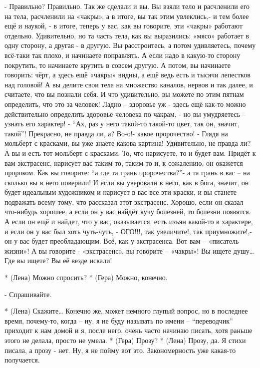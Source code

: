 - Правильно? Правильно. Так же сделали и вы. Вы взяли тело и расчленили его на тела, расчленили на «чакры», а в итоге, вы так этим увлеклись,- и тем более ещё и наукой, - в итоге, теперь у вас, как вы говорите, эти «чакры» работают отдельно. Удивительно, но та часть тела, как вы выразились: «мясо» работает в одну сторону, а другая - в другую. Вы расстроитесь, а потом удивляетесь, почему всё-таки так плохо, и начинаете поправлять. А если надо в какую-то сторону покрутить, то начинаете крутить в совсем другую. А потом, вы начинаете говорить: чёрт, а здесь ещё «чакры» видны, а ещё ведь есть и тысячи лепестков над головой! А вы  делите свои тела на множество каналов, нервов и так далее, и считаете, что вы познали себя. И что удивительно, вы можете по этим пятнам определить, что это за человек! Ладно – здоровье  уж - здесь ещё как-то можно действительно определить здоровье  человека по чакрам, - но вы умудряетесь – узнать его характер! - “Ах, раз у него такой-то такой-то цвет, так он, значит, такой”! Прекрасно, не правда ли, а? Во-о!- какое пророчество! - Глядя на мольберт с красками, вы уже знаете какова  картина!  Удивительно, не правда ли? А вы и есть тот мольберт с красками. То, что нарисуете, то и будет вам. Придёт к вам экстрасенс, нарисует вас таким-то, таким-то и, к сожалению, он окажется пророком. Как вы говорите: “а где та грань пророчества?”- а та грань в вас – на сколько вы в него поверили! И если вы уверовали в него, как в бога, значит, он будет идеальным художником и нарисует в вас все эти краски, и вы станете подражать всему тому, что рассказал этот экстрасенс. Хорошо, если он сказал что-нибудь хорошее, а если он у вас найдёт кучу болезней, то болезни появятся.  А если он ещё и найдет, что у вас, оказывается, есть изъян какой-то в характере, и если он у вас был хоть чуть-чуть, - ОГО!!!, так увеличите!, так приумножите!,- он у вас будет преобладающим. Всё, как у экстрасенса. Вот вам – «писатель жизни»! А вы говорите - «экстрасенс», вы говорите – «чакры»! Вы ищете душу… Где вы ищете? Вы её везде искали!

* (Лена) Можно спросить?
* (Гера) Можно, конечно.

- Спрашивайте.

* (Лена) Скажите… Конечно же, может немного глупый вопрос, но в последнее время, почему-то, когда – ну, я не буду называть по имени – “переводчик” приходит к нам домой и я, после него, очень часто начинаю писать, хотя раньше этого не делала, просто не умела.
* (Гера) Прозу?
* (Лена) Прозу, да. Я стихи писала, а прозу - нет. Ну, я не пойму вот это. Закономерность уже какая-то  получается.

